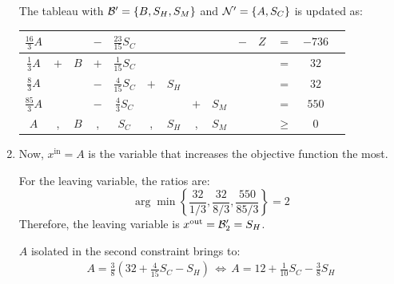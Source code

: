 \begin{example}
\begin{enumerate}
            The tableau with $\mathcal{B}' = \{ B, S_H, S_M \}$ and $\mathcal{N}' = \{ A, S_C \}$ is updated as:
            \begin{center}
                \begin{tabular}{cccccccccccccc}
                    \toprule
                    $\frac{16}{3}A$ & & & $-$ & $\frac{23}{15}S_C$ & & & & & $-$ & $Z$ & $=$ & $-736$ \\
                    \midrule
                    $\frac{1}{3}A$ & $+$ & $B$ & $+$ & $\frac{1}{15}S_C$ & & & & & & & $=$ & $32$ \\
                    $\frac{8}{3}A$ & & & $-$ & $\frac{4}{15}S_C$ & $+$ & $S_H$ & & & & & $=$ & $32$ \\
                    $\frac{85}{3}A$ & & & $-$ & $\frac{4}{3}S_C$ & & & $+$ & $S_M$ & & & $=$ & $550$ \\
                    \midrule
                    $A$ & , & $B$ & , & $S_C$ & , & $S_H$ & , & $S_M$ & & & $\geq$ & 0 \\
                    \bottomrule
                \end{tabular}
            \end{center}

        \item 
            Now, $x^\text{in} = A$ is the variable that increases the objective function the most.

            For the leaving variable, the ratios are:
            \[ \arg\min \left\{ \frac{32}{1/3}, \frac{32}{8/3}, \frac{550}{85/3} \right\} = 2 \]
            Therefore, the leaving variable is $x^\text{out} = \mathcal{B}'_2 = S_H$.

            $A$ isolated in the second constraint brings to:
            \[ 
                \begin{split}
                    A = \frac{3}{8} (32 + \frac{4}{15}S_C - S_H) \,\iff\, A = 12 + \frac{1}{10}S_C - \frac{3}{8}S_H
                \end{split}    
            \]


\end{enumerate}
\end{example}
